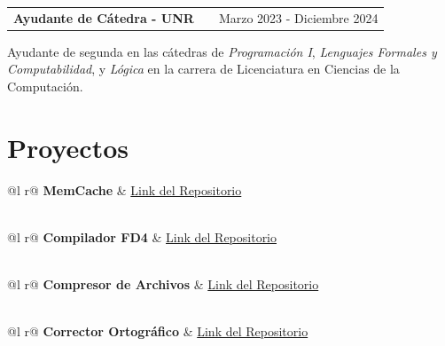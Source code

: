 \documentclass[a4paper,12pt]{article}
\makeatletter
\newenvironment{jobshort}[2]
    {
    \begin{tabularx}{\linewidth}{@{}l X r@{}}
    \textbf{#1} & \hfill & #2 \\[3.75pt]
    \end{tabularx}
    }
    {}
\makeatother
\begin{document}
\vspace{5pt}

\begin{jobshort}{Ayudante de Cátedra - UNR}{Marzo 2023 - Diciembre 2024}
  Ayudante de segunda en las cátedras de \textit{Programación I}, \textit{Lenguajes Formales y Computabilidad}, y \textit{Lógica} en la carrera de Licenciatura en Ciencias de la Computación.
\end{jobshort}

\section{Proyectos}

\begin{tabularx}{\linewidth}{ @{}l r@{} }
\textbf{MemCache} & \hfill \href{https://github.com/AgusM01/MiniMemcached}{Link del Repositorio} \\[3.75pt]
  \\
\end{tabularx}

\begin{tabularx}{\linewidth}{ @{}l r@{} }
\textbf{Compilador FD4} & \hfill \href{https://github.com/llascola/FD4-compiler}{Link del Repositorio} \\[3.75pt]
  \\
\end{tabularx}

\begin{tabularx}{\linewidth}{ @{}l r@{} }
\textbf{Compresor de Archivos} & \hfill \href{https://github.com/llascola/compresor-huffmancode}{Link del Repositorio} \\[3.75pt]
  \\
\end{tabularx}

\begin{tabularx}{\linewidth}{ @{}l r@{} }
\textbf{Corrector Ortográfico} & \hfill \href{https://github.com/llascola/spell-checker}{Link del Repositorio} \\[3.75pt]
  \\
\end{tabularx}
\end{document}
